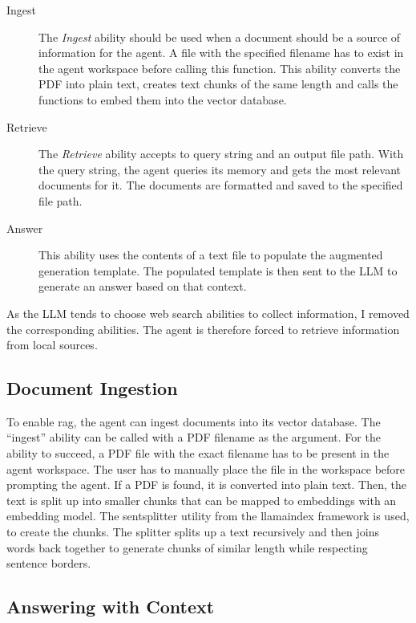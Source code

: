 \documentclass[../main.tex]{subfiles}
\begin{document}
\begin{description}
    \item[Ingest] The \emph{Ingest} ability should be used
          when a document should be a source of information for the agent.
          A file with the specified filename has to exist in the agent workspace before calling this function.
          This ability converts the PDF into plain text, creates text chunks of the same length
          and calls the functions to embed them into the vector database.
    \item[Retrieve] The \emph{Retrieve} ability accepts to query string and an output file path.
          With the query string, the agent queries its memory and gets the most relevant documents for it.
          The documents are formatted and saved to the specified file path.
    \item[Answer] This ability uses the contents of a text file to populate the augmented generation template.
          The populated template is then sent to the LLM to generate an answer based on that context.

\end{description}

As the LLM tends to choose web search abilities to collect information, I removed the corresponding abilities.
The agent is therefore forced to retrieve information from local sources.

\subsection{Document Ingestion}

To enable \gls{rag},
the agent can ingest documents into its vector database.
The “ingest” ability can be called with a PDF filename as the argument.
For the ability to succeed, a PDF file with the exact filename has to be present
in the agent workspace.
The user has to manually place the file in the workspace before prompting the agent.
If a PDF is found, it is converted into plain text.
Then, the text is split up into smaller chunks that can be mapped to embeddings
with an embedding model.
The \gls{sentsplitter} utility from the \gls{llamaindex} framework \cite{zotero-255} is used,
to create the chunks.
The splitter splits up a text recursively and then joins words back together to
generate chunks of similar length while respecting sentence borders.

\subsection{Answering with Context}
\end{document}
